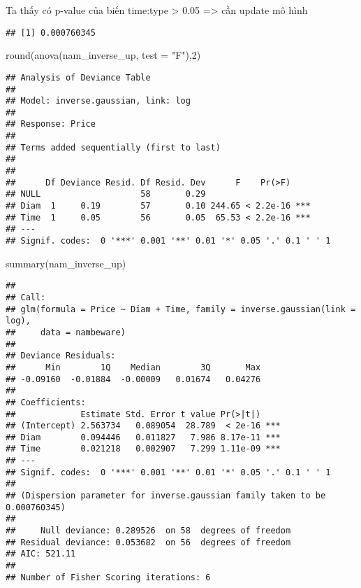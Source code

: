 \documentclass[
]{article}
\newenvironment{Shaded}{\begin{snugshade}}{\end{snugshade}}
\newcommand{\AttributeTok}[1]{\textcolor[rgb]{0.77,0.63,0.00}{#1}}
\newcommand{\DecValTok}[1]{\textcolor[rgb]{0.00,0.00,0.81}{#1}}
\newcommand{\FunctionTok}[1]{\textcolor[rgb]{0.00,0.00,0.00}{#1}}
\newcommand{\NormalTok}[1]{#1}
\newcommand{\OtherTok}[1]{\textcolor[rgb]{0.56,0.35,0.01}{#1}}
\newcommand{\SpecialCharTok}[1]{\textcolor[rgb]{0.00,0.00,0.00}{#1}}
\newcommand{\StringTok}[1]{\textcolor[rgb]{0.31,0.60,0.02}{#1}}
\begin{document}
Ta thấy có p-value của biến time:type \textgreater{} 0.05
=\textgreater{} cần update mô hình

\begin{Shaded}
\end{Shaded}

\begin{verbatim}
## [1] 0.000760345
\end{verbatim}

\begin{Shaded}
\begin{Highlighting}[]
\FunctionTok{round}\NormalTok{(}\FunctionTok{anova}\NormalTok{(nam\_inverse\_up, }\AttributeTok{test =} \StringTok{"F"}\NormalTok{),}\DecValTok{2}\NormalTok{)}
\end{Highlighting}
\end{Shaded}

\begin{verbatim}
## Analysis of Deviance Table
## 
## Model: inverse.gaussian, link: log
## 
## Response: Price
## 
## Terms added sequentially (first to last)
## 
## 
##      Df Deviance Resid. Df Resid. Dev      F    Pr(>F)    
## NULL                    58       0.29                     
## Diam  1     0.19        57       0.10 244.65 < 2.2e-16 ***
## Time  1     0.05        56       0.05  65.53 < 2.2e-16 ***
## ---
## Signif. codes:  0 '***' 0.001 '**' 0.01 '*' 0.05 '.' 0.1 ' ' 1
\end{verbatim}

\begin{Shaded}
\begin{Highlighting}[]
\FunctionTok{summary}\NormalTok{(nam\_inverse\_up)}
\end{Highlighting}
\end{Shaded}

\begin{verbatim}
## 
## Call:
## glm(formula = Price ~ Diam + Time, family = inverse.gaussian(link = log), 
##     data = nambeware)
## 
## Deviance Residuals: 
##      Min        1Q    Median        3Q       Max  
## -0.09160  -0.01884  -0.00009   0.01674   0.04276  
## 
## Coefficients:
##             Estimate Std. Error t value Pr(>|t|)    
## (Intercept) 2.563734   0.089054  28.789  < 2e-16 ***
## Diam        0.094446   0.011827   7.986 8.17e-11 ***
## Time        0.021218   0.002907   7.299 1.11e-09 ***
## ---
## Signif. codes:  0 '***' 0.001 '**' 0.01 '*' 0.05 '.' 0.1 ' ' 1
## 
## (Dispersion parameter for inverse.gaussian family taken to be 0.000760345)
## 
##     Null deviance: 0.289526  on 58  degrees of freedom
## Residual deviance: 0.053682  on 56  degrees of freedom
## AIC: 521.11
## 
## Number of Fisher Scoring iterations: 6
\end{verbatim}
\end{document}
